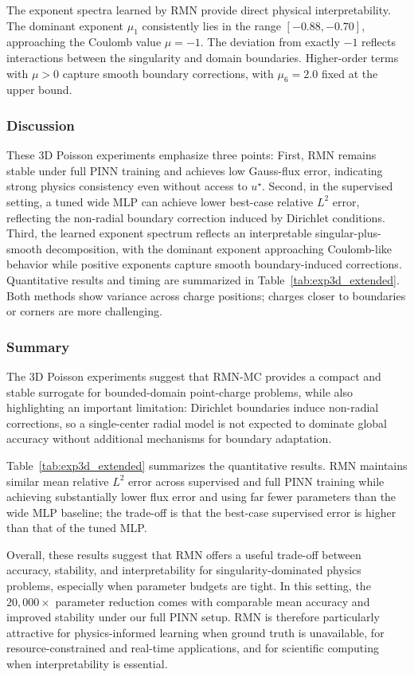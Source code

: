 \documentclass[twoside,11pt]{article}
\begin{document}
The exponent spectra learned by RMN provide direct physical interpretability. The dominant exponent $\mu_1$ consistently lies in the range $[-0.88, -0.70]$, approaching the Coulomb value $\mu = -1$. The deviation from exactly $-1$ reflects interactions between the singularity and domain boundaries. Higher-order terms with $\mu > 0$ capture smooth boundary corrections, with $\mu_6 = 2.0$ fixed at the upper bound.

\subsubsection{Discussion}

These 3D Poisson experiments emphasize three points:
First, RMN remains stable under full PINN training and achieves low Gauss-flux error, indicating strong physics consistency even without access to $u^\star$. Second, in the supervised setting, a tuned wide MLP can achieve lower best-case relative $L^2$ error, reflecting the non-radial boundary correction induced by Dirichlet conditions. Third, the learned exponent spectrum reflects an interpretable singular-plus-smooth decomposition, with the dominant exponent approaching Coulomb-like behavior while positive exponents capture smooth boundary-induced corrections.
Quantitative results and timing are summarized in Table~\ref{tab:exp3d_extended}. Both methods show variance across charge positions; charges closer to boundaries or corners are more challenging.


\subsubsection{Summary}

The 3D Poisson experiments suggest that RMN-MC provides a compact and stable surrogate for bounded-domain point-charge problems, while also highlighting an important limitation: Dirichlet boundaries induce non-radial corrections, so a single-center radial model is not expected to dominate global accuracy without additional mechanisms for boundary adaptation.

Table~\ref{tab:exp3d_extended} summarizes the quantitative results. RMN maintains similar mean relative $L^2$ error across supervised and full PINN training while achieving substantially lower flux error and using far fewer parameters than the wide MLP baseline; the trade-off is that the best-case supervised error is higher than that of the tuned MLP.

Overall, these results suggest that RMN offers a useful trade-off between accuracy, stability, and interpretability for singularity-dominated physics problems, especially when parameter budgets are tight. In this setting, the $20{,}000\times$ parameter reduction comes with comparable mean accuracy and improved stability under our full PINN setup. RMN is therefore particularly attractive for physics-informed learning when ground truth is unavailable, for resource-constrained and real-time applications, and for scientific computing when interpretability is essential.
\end{document}

